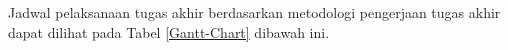  Jadwal pelaksanaan tugas akhir berdasarkan metodologi pengerjaan tugas akhir dapat dilihat pada Tabel \ref{Gantt-Chart} dibawah ini.
 \begin{table}[htb]
	 \centering
	 \caption{Gantt Chart jadwal pelaksanaan tugas akhir}
	 \label{Gantt-Chart}
	 \end{table}



